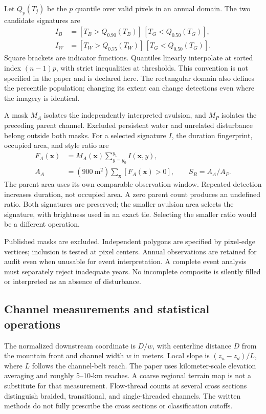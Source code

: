 \documentclass[11pt]{article}
\begin{document}
Let $Q_p(T_j)$ be the $p$ quantile over valid pixels in an annual domain.
The two candidate signatures are
\begin{align}
 I_B &= [T_B>Q_{0.90}(T_B)]\,[T_G<Q_{0.50}(T_G)],\\
 I_W &= [T_W>Q_{0.75}(T_W)]\,[T_G<Q_{0.50}(T_G)].
\end{align}
Square brackets are indicator functions. Quantiles linearly interpolate at
sorted index $(n-1)p$, with strict inequalities at thresholds. This convention
is not specified in the paper and is declared here. The rectangular domain
also defines the percentile population; changing its extent can change
detections even where the imagery is identical.

A mask $M_A$ isolates the independently interpreted avulsion, and $M_P$
isolates the preceding parent channel. Excluded persistent water and unrelated
disturbance belong outside both masks. For a selected signature $I$, the
duration fingerprint, occupied area, and style ratio are
\begin{align}
 F_A(\mathbf{x}) &= M_A(\mathbf{x})\sum_{y=y_0}^{y_1}I(\mathbf{x},y),\\
 A_A &= (900\ \mathrm{m^2})\sum_{\mathbf{x}}[F_A(\mathbf{x})>0],
 \qquad S_R=A_A/A_P.
\end{align}
The parent area uses its own comparable observation window. Repeated
detection increases duration, not occupied area. A zero parent count produces
an undefined ratio. Both signatures are preserved; the smaller avulsion area
selects the signature, with brightness used in an exact tie. Selecting the
smaller ratio would be a different operation.

Published masks are excluded. Independent polygons are specified by pixel-edge
vertices; inclusion is tested at pixel centers. Annual observations are
retained for audit even when unusable for event interpretation. A complete
event analysis must separately reject inadequate years. No incomplete
composite is silently filled or interpreted as an absence of disturbance.

\subsection{Channel measurements and statistical operations}
The normalized downstream coordinate is $D/w$, with centerline distance $D$
from the mountain front and channel width $w$ in meters. Local slope is
$(z_u-z_d)/L$, where $L$ follows the channel-belt reach. The paper uses
kilometer-scale elevation averaging and roughly 5--10-km reaches. A coarse
regional terrain map is not a substitute for that measurement. Flow-thread
counts at several cross sections distinguish braided, transitional, and
single-threaded channels. The written methods do not fully prescribe the
cross sections or classification cutoffs.
\end{document}
